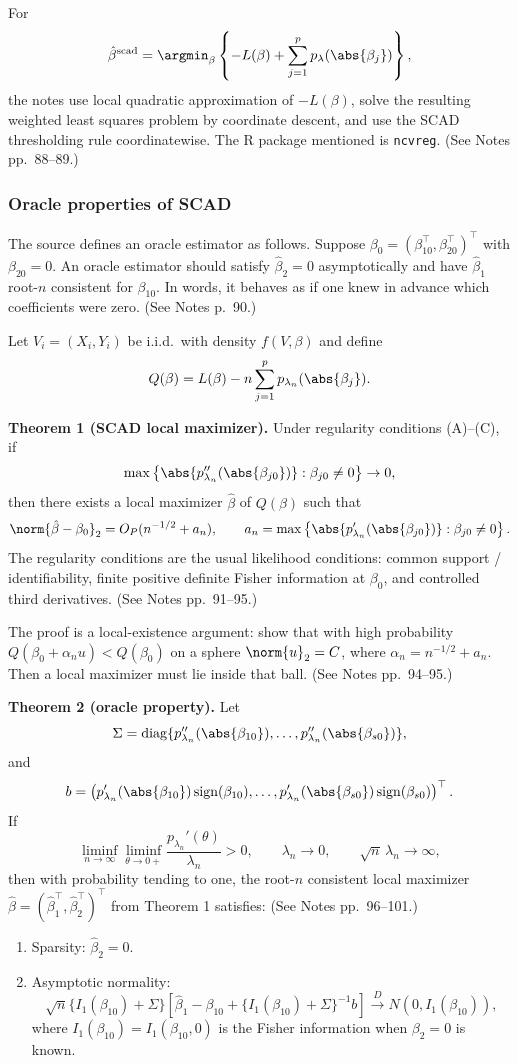 For
\[
\hat\beta^{\mathrm{scad}}
=\argmin_\beta
\left\{-L(\beta)+\sum_{j=1}^p p_\lambda(\abs{\beta_j})\right\},
\]
the notes use local quadratic approximation of $-L(\beta)$, solve the resulting weighted least squares problem by coordinate descent, and use the SCAD thresholding rule coordinatewise. The R package mentioned is \texttt{ncvreg}. (See Notes pp.~88--89.)

\subsubsection{Oracle properties of SCAD}
The source defines an oracle estimator as follows. Suppose $\beta_0=(\beta_{10}^\top,\beta_{20}^\top)^\top$ with $\beta_{20}=0$. An oracle estimator should satisfy $\hat\beta_2=0$ asymptotically and have $\hat\beta_1$ root-$n$ consistent for $\beta_{10}$. In words, it behaves as if one knew in advance which coefficients were zero. (See Notes p.~90.)

Let $V_i=(X_i,Y_i)$ be i.i.d.\ with density $f(V,\beta)$ and define
\[
Q(\beta)=L(\beta)-n\sum_{j=1}^p p_{\lambda_n}(\abs{\beta_j}).
\]

\textbf{Theorem 1 (SCAD local maximizer).}
Under regularity conditions (A)--(C), if
\[
\max\left\{\abs{p_{\lambda_n}''(\abs{\beta_{j0}})}:\beta_{j0}\ne0\right\}\to0,
\]
then there exists a local maximizer $\hat\beta$ of $Q(\beta)$ such that
\[
\norm{\hat\beta-\beta_0}_2
=O_P(n^{-1/2}+a_n),
\qquad
a_n=
\max\left\{\abs{p_{\lambda_n}'(\abs{\beta_{j0}})}:\beta_{j0}\ne0\right\}.
\]
The regularity conditions are the usual likelihood conditions: common support / identifiability, finite positive definite Fisher information at $\beta_0$, and controlled third derivatives. (See Notes pp.~91--95.)

The proof is a local-existence argument: show that with high probability $Q(\beta_0+\alpha_nu)<Q(\beta_0)$ on a sphere $\norm{u}_2=C$, where $\alpha_n=n^{-1/2}+a_n$. Then a local maximizer must lie inside that ball. (See Notes pp.~94--95.)

\textbf{Theorem 2 (oracle property).}
Let
\[
\Sigma=\operatorname{diag}\{p_{\lambda_n}''(\abs{\beta_{10}}),\ldots,
p_{\lambda_n}''(\abs{\beta_{s0}})\},
\]
and
\[
b=
\left(
p_{\lambda_n}'(\abs{\beta_{10}})\operatorname{sign}(\beta_{10}),
\ldots,
p_{\lambda_n}'(\abs{\beta_{s0}})\operatorname{sign}(\beta_{s0})
\right)^\top.
\]
If
\[
\liminf_{n\to\infty}\liminf_{\theta\to0+}
\frac{p_{\lambda_n}'(\theta)}{\lambda_n}>0,
\qquad
\lambda_n\to0,
\qquad
\sqrt n\,\lambda_n\to\infty,
\]
then with probability tending to one, the root-$n$ consistent local maximizer $\hat\beta=(\hat\beta_1^\top,\hat\beta_2^\top)^\top$ from Theorem 1 satisfies: (See Notes pp.~96--101.)
\begin{enumerate}
    \item[(a)] Sparsity: $\hat\beta_2=0$.
    \item[(b)] Asymptotic normality:
    \[
    \sqrt n\{I_1(\beta_{10})+\Sigma\}
    \left[
    \hat\beta_1-\beta_{10}
    +\{I_1(\beta_{10})+\Sigma\}^{-1}b
    \right]
    \overset{D}{\to}
    N(0,I_1(\beta_{10})),
    \]
    where $I_1(\beta_{10})=I_1(\beta_{10},0)$ is the Fisher information when $\beta_2=0$ is known.
\end{enumerate}

